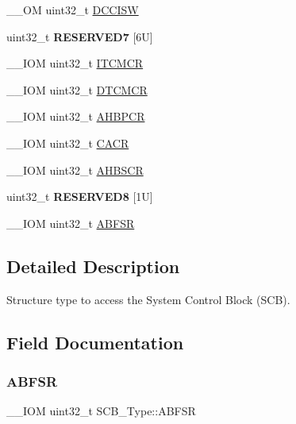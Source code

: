 \begin{DoxyCompactItemize}
\item 
\+\_\+\+\_\+\+OM uint32\+\_\+t \mbox{\hyperlink{structSCB__Type_af50f7a0a9574fe0e24a68bb4eca75140}{D\+C\+C\+I\+SW}}
\item 
\mbox{\label{structSCB__Type_ab635d5f2d9c200c239ccf08e445c2ee0}} 
uint32\+\_\+t {\bfseries R\+E\+S\+E\+R\+V\+E\+D7} \mbox{[}6\+U\mbox{]}
\item 
\+\_\+\+\_\+\+I\+OM uint32\+\_\+t \mbox{\hyperlink{structSCB__Type_aba8abbd3db06a07b50f56547501983f9}{I\+T\+C\+M\+CR}}
\item 
\+\_\+\+\_\+\+I\+OM uint32\+\_\+t \mbox{\hyperlink{structSCB__Type_a2836e932734240076ce91cf4484cdf43}{D\+T\+C\+M\+CR}}
\item 
\+\_\+\+\_\+\+I\+OM uint32\+\_\+t \mbox{\hyperlink{structSCB__Type_a0d53bcea294422b5b4ecfdcd9cdc1773}{A\+H\+B\+P\+CR}}
\item 
\+\_\+\+\_\+\+I\+OM uint32\+\_\+t \mbox{\hyperlink{structSCB__Type_a51f9bd107a4e1d46ba647384e5c825b5}{C\+A\+CR}}
\item 
\+\_\+\+\_\+\+I\+OM uint32\+\_\+t \mbox{\hyperlink{structSCB__Type_a8c9d9eac30594dd061d34cfaacd5e4bb}{A\+H\+B\+S\+CR}}
\item 
\mbox{\label{structSCB__Type_a3e9bfd304a14f0f575d6aa39af43a8b7}} 
uint32\+\_\+t {\bfseries R\+E\+S\+E\+R\+V\+E\+D8} \mbox{[}1\+U\mbox{]}
\item 
\+\_\+\+\_\+\+I\+OM uint32\+\_\+t \mbox{\hyperlink{structSCB__Type_a35a95c9a21f43a569a7ac212acb4cee7}{A\+B\+F\+SR}}
\end{DoxyCompactItemize}


\subsection{Detailed Description}
Structure type to access the System Control Block (S\+CB). 

\subsection{Field Documentation}
\mbox{\label{structSCB__Type_a35a95c9a21f43a569a7ac212acb4cee7}} 
\subsubsection{\texorpdfstring{ABFSR}{ABFSR}}
{\footnotesize\ttfamily \+\_\+\+\_\+\+I\+OM uint32\+\_\+t S\+C\+B\+\_\+\+Type\+::\+A\+B\+F\+SR}

